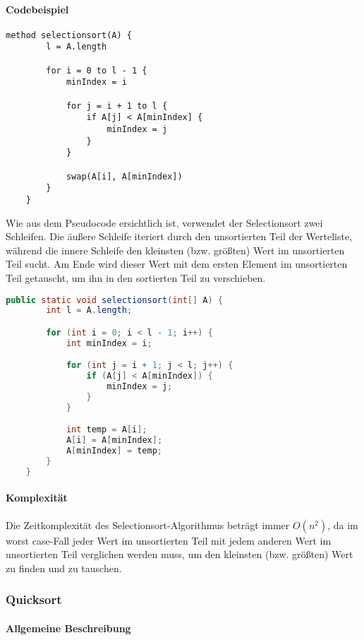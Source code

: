 \documentclass{article}
\begin{document}
	\paragraph{Codebeispiel}
	\begin{lstlisting}[caption=Der Selectionsort-Algorithmus in einfachem Pseudocode]
	method selectionsort(A) {
		l = A.length

		for i = 0 to l - 1 {
			minIndex = i

			for j = i + 1 to l {
				if A[j] < A[minIndex] {
					minIndex = j
				}
			}

			swap(A[i], A[minIndex])
		}
	}
	\end{lstlisting}

	Wie aus dem Pseudocode ersichtlich ist, verwendet der Selectionsort zwei Schleifen. Die äußere Schleife iteriert durch den unsortierten Teil der Werteliste, während die innere Schleife den kleinsten (bzw. größten) Wert im unsortierten Teil sucht. Am Ende wird dieser Wert mit dem ersten Element im unsortierten Teil getauscht, um ihn in den sortierten Teil zu verschieben.

	\begin{lstlisting}[language=Java, caption=Der Selectionsort-Algorithmus in Java]
	public static void selectionsort(int[] A) {
		int l = A.length;

		for (int i = 0; i < l - 1; i++) {
			int minIndex = i;

			for (int j = i + 1; j < l; j++) {
				if (A[j] < A[minIndex]) {
					minIndex = j;
				}
			}

			int temp = A[i];
			A[i] = A[minIndex];
			A[minIndex] = temp;
		}
	}
	\end{lstlisting}

	\paragraph{Komplexität}
	Die Zeitkomplexität des Selectionsort-Algorithmus beträgt immer \textbf{$O(n^2)$}, da im worst case-Fall jeder Wert im unsortierten Teil mit jedem anderen Wert im unsortierten Teil verglichen werden muss, um den kleinsten (bzw. größten) Wert zu finden und zu tauschen.
	
	\subsubsection{Quicksort}
	
	\paragraph{Allgemeine Beschreibung}
	
\end{document}
